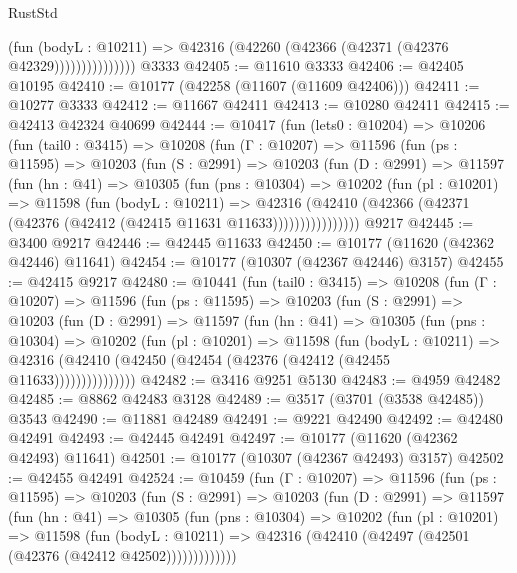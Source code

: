 \begin{lexlean}{RustStd}
\begin{coremodule}
                        (fun (bodyL : @10211) =>
                        @42316 (@42260 (@42366 (@42371 (@42376 @42329)))))))))))))))
    @3333
@42405 := @11610 @3333
@42406 := @42405 @10195
@42410 := @10177 (@42258 (@11607 (@11609 @42406)))
@42411 := @10277 @3333
@42412 := @11667 @42411
@42413 := @10280 @42411
@42415 := @42413 @42324 @40699
@42444 := @10417
    (fun (lets0 : @10204) =>
    @10206
      (fun (tail0 : @3415) =>
      @10208
        (fun (Γ : @10207) =>
        @11596
          (fun (ps : @11595) =>
          @10203
            (fun (S : @2991) =>
            @10203
              (fun (D : @2991) =>
              @11597
                (fun (hn : @41) =>
                @10305
                  (fun (pns : @10304) =>
                  @10202
                    (fun (pl : @10201) =>
                    @11598
                      (fun (bodyL : @10211) =>
                      @42316
                        (@42410
                          (@42366 (@42371 (@42376 (@42412 (@42415 @11631 @11633))))))))))))))))
    @9217
@42445 := @3400 @9217
@42446 := @42445 @11633
@42450 := @10177 (@11620 (@42362 @42446) @11641)
@42454 := @10177 (@10307 (@42367 @42446) @3157)
@42455 := @42415 @9217
@42480 := @10441
    (fun (tail0 : @3415) =>
    @10208
      (fun (Γ : @10207) =>
      @11596
        (fun (ps : @11595) =>
        @10203
          (fun (S : @2991) =>
          @10203
            (fun (D : @2991) =>
            @11597
              (fun (hn : @41) =>
              @10305
                (fun (pns : @10304) =>
                @10202
                  (fun (pl : @10201) =>
                  @11598
                    (fun (bodyL : @10211) =>
                    @42316 (@42410 (@42450 (@42454 (@42376 (@42412 (@42455 @11633)))))))))))))))
@42482 := @3416 @9251 @5130
@42483 := @4959 @42482
@42485 := @8862 @42483 @3128
@42489 := @3517 (@3701 (@3538 @42485)) @3543
@42490 := @11881 @42489
@42491 := @9221 @42490
@42492 := @42480 @42491
@42493 := @42445 @42491
@42497 := @10177 (@11620 (@42362 @42493) @11641)
@42501 := @10177 (@10307 (@42367 @42493) @3157)
@42502 := @42455 @42491
@42524 := @10459
    (fun (Γ : @10207) =>
    @11596
      (fun (ps : @11595) =>
      @10203
        (fun (S : @2991) =>
        @10203
          (fun (D : @2991) =>
          @11597
            (fun (hn : @41) =>
            @10305
              (fun (pns : @10304) =>
              @10202
                (fun (pl : @10201) =>
                @11598
                  (fun (bodyL : @10211) =>
                  @42316 (@42410 (@42497 (@42501 (@42376 (@42412 @42502)))))))))))))

\end{coremodule}
\end{lexlean}
